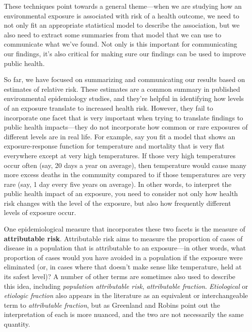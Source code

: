 \documentclass[
]{book}
\begin{document}
These techniques point towards a general theme---when we are studying how an environmental exposure is associated with risk of a health outcome, we need to not only fit an appropriate statistical model to describe the association, but we also need to extract some summaries from that model that we can use to communicate what we've found. Not only is this important for communicating our findings, it's also critical for making sure our findings can be used to improve public health.

So far, we have focused on summarizing and communicating our results based on estimates of relative risk. These estimates are a common summary in published environmental epidemiology studies, and they're helpful in identifying how levels of an exposure translate to increased health risk. However, they fail to incorporate one facet that is very important when trying to translate findings to public health impacts---they do not incorporate how common or rare exposures of different levels are in real life. For example, say you fit a model that shows an exposure-response function for temperature and mortality that is very flat everywhere except at very high temperatures. If those very high temperatures occur often (say, 20 days a year on average), then temperature would cause many more excess deaths in the community compared to if those temperatures are very rare (say, 1 day every five years on average). In other words, to interpret the public health impact of an exposure, you need to consider not only how health risk changes with the level of the exposure, but also how frequently different levels of exposure occur.

One epidemiological measure that incorporates these two facets is the measure of \textbf{attributable risk}. Attributable risk aims to measure the proportion of cases of disease in a population that is attributable to an exposure---in other words, what proportion of cases would you have avoided in a population if the exposure were eliminated (or, in cases where that doesn't make sense like temperature, held at its safest level)? A number of other terms are sometimes also used to describe this idea, including \emph{population attributable risk}, \emph{attributable fraction}. \emph{Etiological} or \emph{etiologic fraction} also appears in the literature as an equivalent or interchangeable term to \emph{attributable fraction}, but as Greenland and Robins point out \citep{greenland1988conceptual} the interpretation of each is more nuanced, and the two are not necessarily the same quantity.
\end{document}
